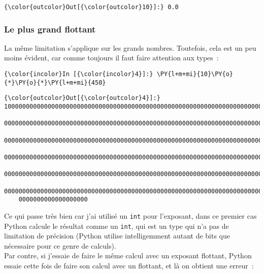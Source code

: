 \begin{Verbatim}[commandchars=\\\{\}]
{\color{outcolor}Out[{\color{outcolor}10}]:} 0.0
\end{Verbatim}
            
    \hypertarget{le-plus-grand-flottant}{%
\subsubsection{Le plus grand flottant}\label{le-plus-grand-flottant}}

    La même limitation s'applique sur les grands nombres. Toutefois, cela
est un peu moins évident, car comme toujours il faut faire attention aux
types~:

    \begin{Verbatim}[commandchars=\\\{\}]
{\color{incolor}In [{\color{incolor}4}]:} \PY{l+m+mi}{10}\PY{o}{*}\PY{o}{*}\PY{l+m+mi}{450}
\end{Verbatim}


\begin{Verbatim}[commandchars=\\\{\}]
{\color{outcolor}Out[{\color{outcolor}4}]:} 100000000000000000000000000000000000000000000000000000000000000000000000\\
	000000000000000000000000000000000000000000000000000000000000000000000000\\
	000000000000000000000000000000000000000000000000000000000000000000000000\\
	000000000000000000000000000000000000000000000000000000000000000000000000\\
	000000000000000000000000000000000000000000000000000000000000000000000000\\
	000000000000000000000000000000000000000000000000000000000000000000000000\\
	0000000000000000000
\end{Verbatim}
            
    Ce qui passe très bien car j'ai utilisé un \texttt{int} pour l'exposant,
dans ce premier cas Python calcule le résultat comme un \texttt{int},
qui est un type qui n'a pas de limitation de précision (Python utilise
intelligemment autant de bits que nécessaire pour ce genre de calculs).\\

Par contre, si j'essaie de faire le même calcul avec un exposant
flottant, Python essaie cette fois de faire son calcul avec un flottant,
et là on obtient une erreur~:

